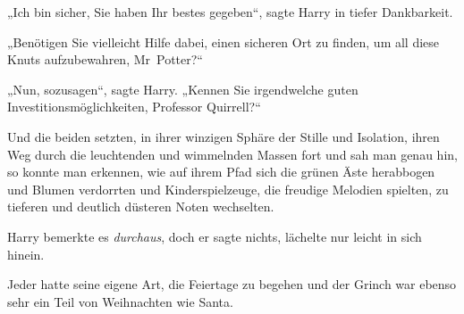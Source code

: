 „Ich bin sicher, Sie haben Ihr bestes gegeben“, sagte Harry in tiefer Dankbarkeit.

„Benötigen Sie vielleicht Hilfe dabei, einen sicheren Ort zu finden, um all diese Knuts aufzubewahren, Mr~Potter?“

„Nun, sozusagen“, sagte Harry. „Kennen Sie irgendwelche guten Investitionsmöglichkeiten, Professor Quirrell?“

Und die beiden setzten, in ihrer winzigen Sphäre der Stille und Isolation, ihren Weg durch die leuchtenden und wimmelnden Massen fort und sah man genau hin, so konnte man erkennen, wie auf ihrem Pfad sich die grünen Äste herabbogen und Blumen verdorrten und Kinderspielzeuge, die freudige Melodien spielten, zu tieferen und deutlich düsteren Noten wechselten.

Harry bemerkte es \emph{durchaus}, doch er sagte nichts, lächelte nur leicht in sich hinein.

Jeder hatte seine eigene Art, die Feiertage zu begehen und der Grinch war ebenso sehr ein Teil von Weihnachten wie Santa.

